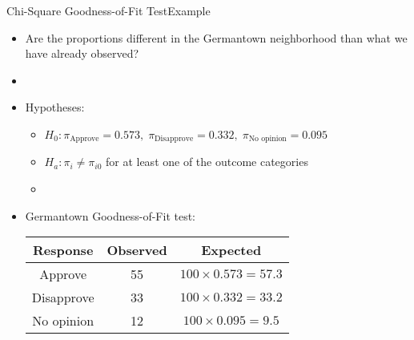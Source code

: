 \documentclass[xcolor=dvipsnames]{beamer}
\begin{document}
\begin{frame}{Chi-Square Goodness-of-Fit Test}{Example}
	\begin{itemize}
		\item Are the proportions different in the Germantown neighborhood than what we have already observed? \pause
		\item[]
		\item Hypotheses:\pause
		\begin{itemize}
			\item $H_0: \pi_{\text{Approve}} = 0.573,\; \pi_{\text{Disapprove}} = 0.332,\; \pi_{\text{No opinion}}=0.095$ \pause
			\item $H_a: \pi_i \neq \pi_{i0}$ for at least one of the outcome categories \pause
			\item[]
		\end{itemize}
	\item Germantown Goodness-of-Fit test: \pause
	\vspace{1mm}
	\begin{center}
		\begin{tabular}{ccc}
			\hline
			Response & Observed & Expected \\ \hline \hline
			Approve & 55 & $100 \times 0.573 = 57.3$\\
			Disapprove & 33 & $100 \times 0.332 = 33.2$ \\
			No opinion & 12 & $100 \times 0.095 = 9.5$ \\ \hline
		\end{tabular}
	\end{center}
	\end{itemize}
\end{frame}
\end{document}
